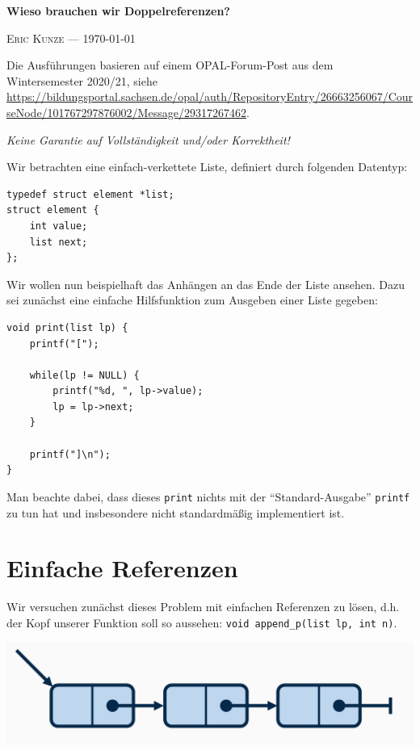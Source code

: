 \documentclass[ngerman, a4paper, 11pt]{scrartcl}
\newcommand*\ruleline[1]{\par\noindent\raisebox{.8ex}{\makebox[\linewidth]{\hrulefill\hspace{1ex}\raisebox{-.8ex}{#1}\hspace{1ex}\hrulefill}}}
\begin{document}
\begin{center}
	{\bfseries \sffamily \huge Wieso brauchen wir Doppelreferenzen?} 
	
	\ruleline{\sffamily \Large Übungsblatt 6}
	
	{\scshape Eric Kunze --- \today}
\end{center}
\medskip

{ \footnotesize \doclicenseThis }

\begin{center}
	\small 
	Die Ausführungen basieren auf einem OPAL-Forum-Post aus dem Wintersemester 2020/21, siehe \url{https://bildungsportal.sachsen.de/opal/auth/RepositoryEntry/26663256067/CourseNode/101767297876002/Message/29317267462}.
	
	\slshape Keine Garantie auf Vollständigkeit und/oder Korrektheit!
\end{center}

\bigskip

Wir betrachten eine einfach-verkettete Liste, definiert durch folgenden Datentyp:
\begin{lstlisting}
typedef struct element *list;
struct element {
	int value;
	list next;
};
\end{lstlisting}

Wir wollen nun beispielhaft das Anhängen an das Ende der Liste ansehen. Dazu sei zunächst eine einfache Hilfsfunktion zum Ausgeben einer Liste gegeben:
\begin{lstlisting}
void print(list lp) {
	printf("[");
	
	while(lp != NULL) {
		printf("%d, ", lp->value);
		lp = lp->next;
	}
	
	printf("]\n");
}
\end{lstlisting}

Man beachte dabei, dass dieses \lstinline[]|print| nichts mit der \enquote{Standard-Ausgabe} \lstinline[]|printf| zu tun hat und insbesondere nicht standardmäßig implementiert ist.


\section{Einfache Referenzen}

Wir versuchen zunächst dieses Problem mit einfachen Referenzen zu lösen, d.h. der Kopf unserer Funktion soll so aussehen: \lstinline[]|void append_p(list lp, int n)|.

\begin{center}
	\includegraphics[width=0.5\linewidth]{./tut06-graphics/tut06_einfacheReferenz.jpg}
\end{center}
\end{document}
